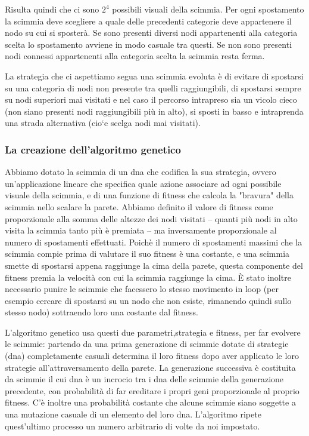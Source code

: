 \documentclass{article}
\begin{document}
Risulta quindi che ci sono $2^4$ possibili visuali della scimmia.
Per ogni spostamento la scimmia deve scegliere a quale delle precedenti categorie deve appartenere il nodo su cui si sposter\`{a}. Se sono presenti diversi nodi appartenenti alla categoria scelta lo spostamento avviene in modo casuale tra questi. Se non sono presenti nodi connessi appartenenti alla categoria scelta la scimmia resta ferma.

La strategia che ci aspettiamo segua una scimmia evoluta \`{e} di evitare di spostarsi su una categoria di nodi non presente tra quelli raggiungibili, di spostarsi sempre su nodi superiori mai visitati e nel caso il percorso intrapreso sia un vicolo cieco (non siano presenti nodi raggiungibili pi\`{u} in alto), si sposti in basso e intraprenda una strada alternativa (cio`{e} scelga nodi mai visitati).

\subsubsection{La creazione dell'algoritmo genetico} Abbiamo dotato la scimmia di un dna che codifica la sua strategia, ovvero un'applicazione lineare che specifica quale azione associare ad ogni possibile visuale della scimmia, e di una funzione di fitness che calcola la "bravura" della scimmia nello scalare la parete. Abbiamo definito il valore di fitness come proporzionale alla somma delle altezze dei nodi visitati -- quanti pi\`{u} nodi in alto visita la scimmia tanto pi\`{u} \`{e} premiata -- ma inversamente proporzionale al numero di spostamenti effettuati. Poich\`{e} il numero di spostamenti massimi che la scimmia compie prima di valutare il suo fitness \`{e} una costante, e una scimmia smette di spostarsi appena raggiunge la cima della parete, questa componente del fitness premia la velocit\`{a} con cui la scimmia raggiunge la cima. \`{E} stato inoltre necessario punire le scimmie che facessero lo stesso movimento in loop (per esempio cercare di spostarsi su un nodo che non esiste, rimanendo quindi sullo stesso nodo) sottraendo loro una costante dal fitness.
 
L'algoritmo genetico usa questi due parametri,strategia e fitness, per far evolvere le scimmie: partendo da una prima generazione di scimmie dotate di strategie (dna) completamente casuali determina il loro fitness dopo aver applicato le loro strategie all'attraversamento della parete. La generazione successiva \`{e} costituita da scimmie il cui dna \`{e} un incrocio tra i dna delle scimmie della generazione precedente, con probabilit\`{a} di far ereditare i propri geni proporzionale al proprio fitness. C'\`{e}  inoltre una probabilit\`{a} costante che alcune scimmie siano soggette a una mutazione casuale di un elemento del loro dna. L'algoritmo ripete quest'ultimo processo un numero arbitrario di volte da noi impostato.
\end{document}
